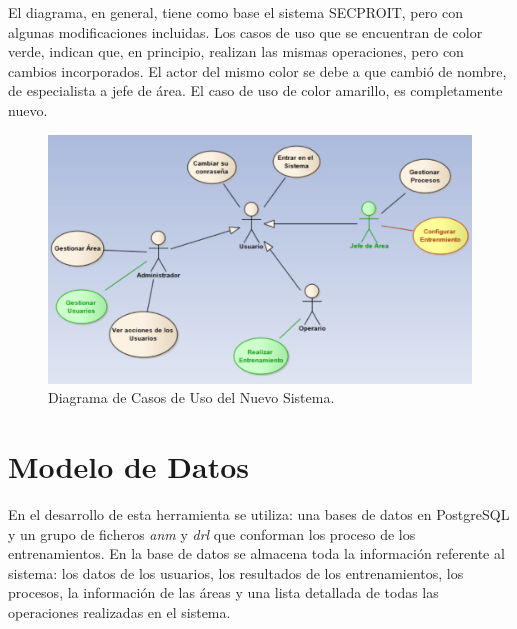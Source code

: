 El diagrama, en general, tiene como base el sistema SECPROIT, pero con algunas modificaciones incluidas. Los casos de uso que se encuentran de color verde, indican que, en principio, realizan las mismas operaciones, pero con cambios incorporados. El actor del mismo color se debe a que cambió de nombre, de especialista a jefe de área. El caso de uso de color amarillo, es completamente nuevo.

\begin{figure}[h]
\centering
 \includegraphics[width=0.8\linewidth]{imagen/casoUso.png}
 \caption{Diagrama de Casos de Uso del Nuevo Sistema.}
 \label{fig:casoUso} 
\end{figure}


\section{Modelo de Datos}
En el desarrollo de esta herramienta se utiliza: una bases de datos en PostgreSQL y un grupo de ficheros \textsl{anm} y \textsl{drl} que conforman los proceso de los entrenamientos. En la base de datos se almacena toda la información referente al sistema: los datos de los usuarios, los resultados de los entrenamientos, los procesos, la información de las áreas y una lista detallada de todas las operaciones realizadas en el sistema.